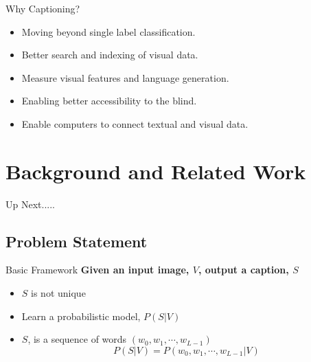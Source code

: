 \documentclass{beamer}
\begin{document}
\begin{frame}{Why Captioning?}
\begin{itemize}
\item Moving beyond single label classification.
\item Better search and indexing of visual data.
\item Measure visual features and language generation.
\item Enabling better accessibility to the blind.
\item Enable computers to connect textual and visual data. 
\end{itemize}
\end{frame}

\section{Background and Related Work}
\begin{frame}{Up Next.....}
\tableofcontents[currentsection] 
\end{frame}
\subsection{Problem Statement}
\begin{frame}{Basic Framework}
\textbf{Given an input image, $V$, output a caption, $S$}
\begin{itemize}
\item $S$ is not unique
\item Learn a probabilistic model, $P(S|V)$
\item $S$, is a sequence of words $(w_0, w_1,\cdots, w_{L-1})$
\begin{equation}
\label{eq:langB1} P(S|V) = P(w_0, w_1, \cdots, w_{L-1}|V)
\end{equation}
\end{itemize} 
\end{frame}
\end{document}

